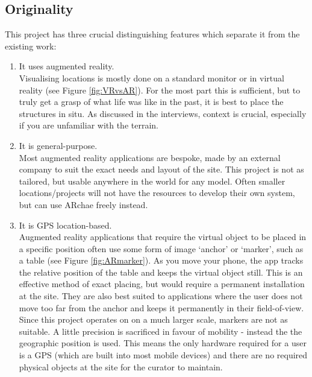 \documentclass{article}
\begin{document}
\subsection{Originality}
This project has three crucial distinguishing features which separate it from the existing work:
\begin{enumerate}
    \item It uses augmented reality. \\
    Visualising locations is mostly done on a standard monitor or in virtual reality (see Figure \ref{fig:VRvsAR}). For the most part this is sufficient, but to truly get a grasp of what life was like in the past, it is best to place the structures in situ. As discussed in the interviews, context is crucial, especially if you are unfamiliar with the terrain.
    \item It is general-purpose. \\
    Most augmented reality applications are bespoke, made by an external company to suit the exact needs and layout of the site. This project is not as tailored, but usable anywhere in the world for any model. Often smaller locations/projects will not have the resources to develop their own system, but can use ARchae freely instead.
    \item It is GPS location-based. \\
    Augmented reality applications that require the virtual object to be placed in a specific position often use some form of image `anchor' or `marker', such as a table (see Figure \ref{fig:ARmarker}). As you move your phone, the app tracks the relative position of the table and keeps the virtual object still. This is an effective method of exact placing, but would require a permanent installation at the site. They are also best suited to applications where the user does not move too far from the anchor and keeps it permanently in their field-of-view. Since this project operates on on a much larger scale, markers are not as suitable. A little precision is sacrificed in favour of mobility - instead the the geographic position is used. This means the only hardware required for a user is a GPS (which are built into most mobile devices) and there are no required physical objects at the site for the curator to maintain. 

\end{enumerate}
\end{document}
